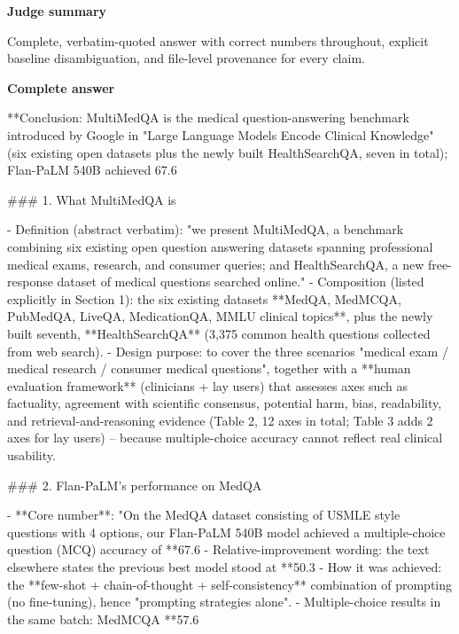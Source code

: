 \documentclass[10pt]{article}
\begin{document}
\textbf{Judge summary}
\begin{EvidenceText}
Complete, verbatim-quoted answer with correct numbers throughout, explicit baseline disambiguation, and file-level provenance for every claim.
\end{EvidenceText}

\textbf{Complete answer}
\begin{AnswerText}
**Conclusion: MultiMedQA is the medical question-answering benchmark introduced by Google in "Large Language Models Encode Clinical Knowledge" (six existing open datasets plus the newly built HealthSearchQA, seven in total); Flan-PaLM 540B achieved 67.6%

### 1. What MultiMedQA is

- Definition (abstract verbatim): "we present MultiMedQA, a benchmark combining six existing open question answering datasets spanning professional medical exams, research, and consumer queries; and HealthSearchQA, a new free-response dataset of medical questions searched online."
- Composition (listed explicitly in Section 1): the six existing datasets **MedQA, MedMCQA, PubMedQA, LiveQA, MedicationQA, MMLU clinical topics**, plus the newly built seventh, **HealthSearchQA** (3,375 common health questions collected from web search).
- Design purpose: to cover the three scenarios "medical exam / medical research / consumer medical questions", together with a **human evaluation framework** (clinicians + lay users) that assesses axes such as factuality, agreement with scientific consensus, potential harm, bias, readability, and retrieval-and-reasoning evidence (Table 2, 12 axes in total; Table 3 adds 2 axes for lay users) -- because multiple-choice accuracy cannot reflect real clinical usability.

### 2. Flan-PaLM's performance on MedQA

- **Core number**: "On the MedQA dataset consisting of USMLE style questions with 4 options, our Flan-PaLM 540B model achieved a multiple-choice question (MCQ) accuracy of **67.6%
- Relative-improvement wording: the text elsewhere states the previous best model stood at **50.3%
- How it was achieved: the **few-shot + chain-of-thought + self-consistency** combination of prompting (no fine-tuning), hence "prompting strategies alone".
- Multiple-choice results in the same batch: MedMCQA **57.6%


\end{AnswerText}
\end{document}

